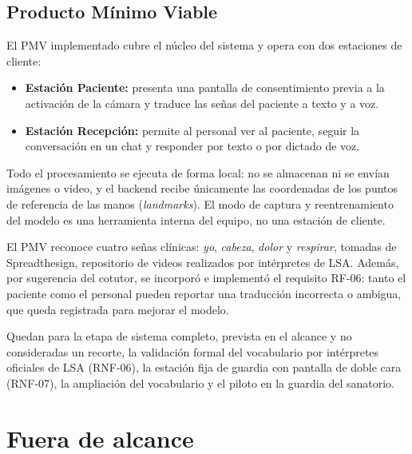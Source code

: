 \subsection{Producto Mínimo Viable}

El PMV implementado cubre el núcleo del sistema y opera con dos estaciones de cliente:
\begin{itemize}
  \item \textbf{Estación Paciente:} presenta una pantalla de consentimiento previa a la activación de la cámara y traduce las señas del paciente a texto y a voz.
  \item \textbf{Estación Recepción:} permite al personal ver al paciente, seguir la conversación en un chat y responder por texto o por dictado de voz.
\end{itemize}
Todo el procesamiento se ejecuta de forma local: no se almacenan ni se envían imágenes o video, y el backend recibe únicamente las coordenadas de los puntos de referencia de las manos (\emph{landmarks}). El modo de captura y reentrenamiento del modelo es una herramienta interna del equipo, no una estación de cliente.

El PMV reconoce cuatro señas clínicas: \emph{yo}, \emph{cabeza}, \emph{dolor} y \emph{respirar}, tomadas de Spreadthesign, repositorio de videos realizados por intérpretes de LSA. Además, por sugerencia del cotutor, se incorporó e implementó el requisito RF-06: tanto el paciente como el personal pueden reportar una traducción incorrecta o ambigua, que queda registrada para mejorar el modelo.

Quedan para la etapa de sistema completo, prevista en el alcance y no consideradas un recorte, la validación formal del vocabulario por intérpretes oficiales de LSA (RNF-06), la estación fija de guardia con pantalla de doble cara (RNF-07), la ampliación del vocabulario y el piloto en la guardia del sanatorio.

\section{Fuera de alcance}

